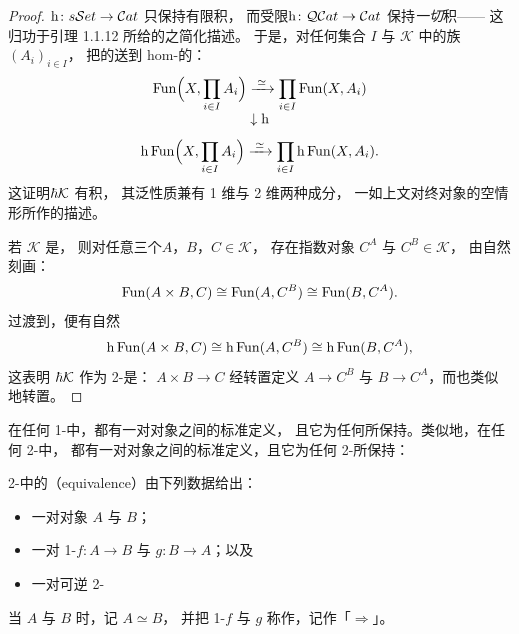 \begin{proof}
\trFunctor $\mathrm{h}\colon s\mathcal{S}et\to\mathcal{C}at$ 只保持有限积，
而受限\trFunctor $\mathrm{h}\colon\mathcal{Q}\mathcal{C}at\to\mathcal{C}at$ 保持\emph{一切}积——
这归功于引理 1.1.12 所给的\trQuasiCategory{}\trHomotopyCategory{}之简化描述。
于是，对任何集合 $I$ 与 $\mathcal{K}$ 中的\trInfinityCategory{}族 $(A_i)_{i\in I}$，
\trHomotopyCategory\trFunctor{}把\trFunctorSpace{}的\trIsomorphism{}送到 hom-\trCategory{}的\trIsomorphism{}：
\begin{equation*}
\begin{array}{c}
\operatorname{Fun}\Bigl(X,\displaystyle\prod_{i\in I}A_i\Bigr)
\xrightarrow{\;\simeq\;}
\displaystyle\prod_{i\in I}\operatorname{Fun}(X,A_i)\\[8pt]
\downarrow\mathrm{h}\\[8pt]
\mathrm{h}\operatorname{Fun}\Bigl(X,\displaystyle\prod_{i\in I}A_i\Bigr)
\xrightarrow{\;\simeq\;}
\displaystyle\prod_{i\in I}\mathrm{h}\operatorname{Fun}(X,A_i).
\end{array}
\end{equation*}
这证明\trHomotopyTwoCategory $\hbar \mathcal{K}$ 有积，
其泛性质兼有 1 维与 2 维两种成分，
一如上文对终对象的空情形所作的描述。

若 $\mathcal{K}$ 是\trCartesianClosed\trInfinityCosmos{}，
则对任意三个\trInfinityCategory $A$，$B$，$C\in\mathcal{K}$，
存在指数对象 $C^A$ 与 $C^B\in\mathcal{K}$，
由自然\trIsomorphism{}刻画：
\begin{equation*}
\operatorname{Fun}(A\times B,C)\cong\operatorname{Fun}(A,C^B)\cong\operatorname{Fun}(B,C^A).
\end{equation*}
过渡到\trHomotopyCategory{}，便有自然\trIsomorphism
\begin{equation*}
\mathrm{h}\operatorname{Fun}(A\times B,C)\cong\mathrm{h}\operatorname{Fun}(A,C^B)\cong\mathrm{h}\operatorname{Fun}(B,C^A),
\end{equation*}
这表明 $\hbar \mathcal{K}$ 作为 2-\trCategory{}是\trCartesianClosed{}：
\trFunctor{} $A\times B\to C$ 经转置定义\trFunctor{} $A\to C^B$ 与
$B\to C^A$，而\trNaturalTransformation{}也类似地转置。
\end{proof}

在任何 1-\trCategory{}中，都有一对对象之间\emph{\trIsomorphism}的标准定义，
且它为任何\trFunctor{}所保持。类似地，在任何 2-\trCategory{}中，
都有一对对象之间\emph{\trEquivalence}的标准定义，且它为任何 2-\trFunctor{}所保持：

\begin{definition}[\trEquivalence]\label{def:equivalence-2-category}
2-\trCategory{}中的\textbf{\trEquivalence}（equivalence）由下列数据给出：
\begin{itemize}
\item 一对对象 $A$ 与 $B$；
\item 一对 1-\trCell $f\colon A\to B$ 与 $g\colon B\to A$；以及
\item 一对可逆 2-\trCell
\begin{center}
\qquad{}\qquad
{}
\end{center}
\end{itemize}
当 $A$ 与 $B$ \textbf{\trEquivalence}时，记 $A\simeq B$，
并把 1-\trCell $f$ 与 $g$ 称作\textbf{\trEquivalence}，记作「$\Rightarrow$」。
\end{definition}

